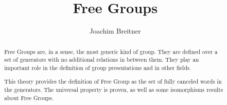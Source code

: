\documentclass[11pt,a4paper]{article}
\begin{document}
\title{Free Groups}
\author{Joachim Breitner}
\maketitle

\begin{abstract}
  Free Groups are, in a sense, the most generic kind of group. They are defined
  over a set of generators with no additional relations in between them. They
  play an important role in the definition of group presentations and in
  other fields.

  This theory provides the definition of Free Group as the set of fully
  canceled words in the generators. The universal property is proven, as well as some
  isomorphisms results about Free Groups.
\end{abstract}

\tableofcontents


\end{document}
